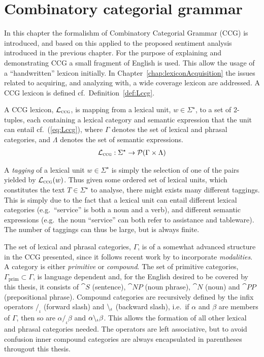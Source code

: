 
\chapter{Combinatory categorial grammar}
\label{chap:ccg}

In this chapter the formalishm of Combinatory Categorial Grammar (CCG) is introduced, and based on this applied to the proposed sentiment analysis introduced in the previous chapter. For the purpose of explaining and demonstrating CCG a small fragment of English is used. This allow the usage of a ``handwritten'' lexicon initially. In Chapter~\ref{chap:lexiconAcquisition} the issues related to acquiring, and analyzing with, a wide coverage lexicon are addressed. A CCG lexicon is defined cf.\ Definition~\ref{def:Lccg}.

\begin{definition}
A CCG lexicon, $\mathcal{L}_\textsc{ccg}$, is mapping from a lexical unit, $w \in \Sigma^\star$, to a set of 2-tuples, each containing a lexical category and semantic expression that the unit can entail cf.\ (\ref{eq:Lccg}), where $\Gamma$ denotes the set of lexical and phrasal categories, and $\Lambda$ denotes the set of semantic expressions.
\begin{align}
 \mathcal{L}_\textsc{ccg}: \Sigma^\star \to \mathcal{P}(\Gamma \times \Lambda)
 \label{eq:Lccg}
\end{align}
\label{def:Lccg}
\vspace{-2em}
\done
\end{definition}

A \emph{tagging} of a lexical unit $w \in \Sigma^\star$ is simply the selection of one of the pairs yielded by $\mathcal{L}_\textsc{ccg}(w)$. Thus given some ordered set of lexical units, which constitutes the text $T \in \Sigma^\star$ to analyse, there might exists many different taggings. This is simply due to the fact that a lexical unit can entail different lexical categories (e.g.\ ``service'' is both a noun and a verb), and different semantic expressions (e.g.\ the noun ``service'' can both refer to assistance and tableware). The number of taggings can thus be large, but is always finite.

The set of lexical and phrasal categories, $\Gamma$, is of a somewhat advanced structure in the CCG presented, since it follows recent work by \citeauthor{multiModalCCG}  to incorporate \emph{modalities}. A category is either \emph{primitive} or \emph{compound}. The set of primitive categories, $\Gamma_\mathrm{prim} \subset \Gamma$, is language dependent and, for the English desired to be covered by this thesis, it consists of $\cat{S}$ (sentence), $\cat{NP}$ (noun phrase), $\cat{N}$ (noun) and $\cat{PP}$ (prepositional phrase). Compound categories are recursively defined by the infix operators $/_\iota$ (forward slash) and $\backslash_\iota$ (backward slash), i.e.\ if $\alpha$ and $\beta$ are members of $\Gamma$, then so are $\alpha/_\iota\beta$ and $\alpha \backslash_\iota \beta$. This allows the formation of all other lexical and phrasal categories needed. The operators are left associative, but to avoid confusion inner compound categories are always encapsulated in parentheses througout this thesis.

